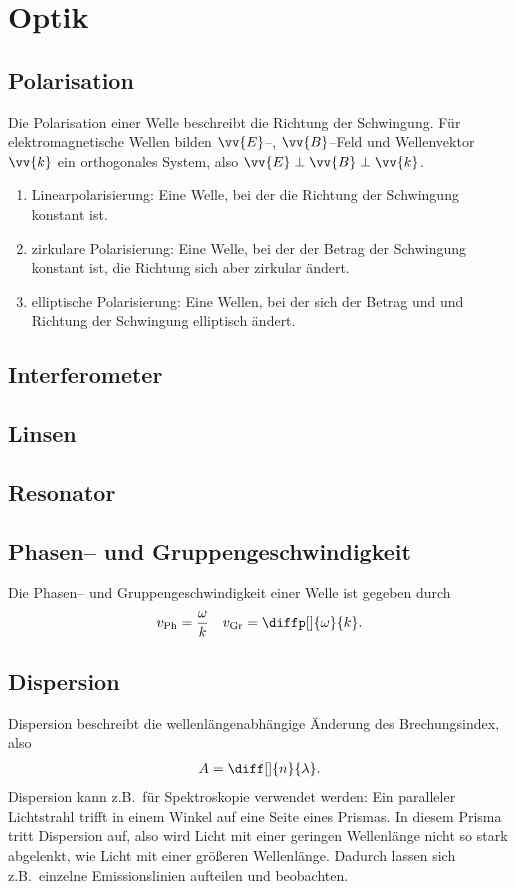\newpage
\section{Optik}
\subsection{Polarisation}
Die Polarisation einer Welle beschreibt die Richtung der Schwingung.
Für elektromagnetische Wellen bilden $\vv{E}$--, $\vv{B}$--Feld und Wellenvektor $\vv{k}$ ein orthogonales System, also $\vv{E}\perp\vv{B}\perp\vv{k}$.
\begin{enumerate}[label=--]
        \item Linearpolarisierung: Eine Welle, bei der die Richtung der Schwingung konstant ist.
        \item zirkulare Polarisierung: Eine Welle, bei der der Betrag der Schwingung konstant ist, die Richtung sich aber zirkular ändert.
        \item elliptische Polarisierung: Eine Wellen, bei der sich der Betrag und und Richtung der Schwingung elliptisch ändert.
\end{enumerate}

\subsection{Interferometer}
\subsection{Linsen}
\subsection{Resonator}
\subsection{Phasen-- und Gruppengeschwindigkeit}
Die Phasen-- und Gruppengeschwindigkeit einer Welle ist gegeben durch
\begin{align} 
        v_\text{Ph}&=\dfrac{\omega }{k}&v_\text{Gr}=\diffp[]{\omega }{k}
.\end{align} 

\subsection{Dispersion}
Dispersion beschreibt die wellenlängenabhängige Änderung des Brechungsindex, also
\begin{align} 
        A=\diff[]{n}{\lambda }
.\end{align} 
Dispersion kann z.B.\ für Spektroskopie verwendet werden:
Ein paralleler Lichtstrahl trifft in einem Winkel auf eine Seite eines Prismas.
In diesem Prisma tritt Dispersion auf, also wird Licht mit einer geringen Wellenlänge nicht so stark abgelenkt, wie Licht mit einer größeren Wellenlänge.
Dadurch lassen sich z.B.\ einzelne Emissionslinien aufteilen und beobachten.

